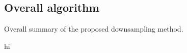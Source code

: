 \documentclass[a4paper,11pt]{article}
\begin{document}
		
		

\subsection{Overall algorithm}


\begin{algorithm}
	\caption{Overall summary of the proposed downsampling method.}
	\label{alg:overall-summary}
	\begin{algorithmic}[1]
        \State hi
    \end{algorithmic}
\end{algorithm}
\end{document}
